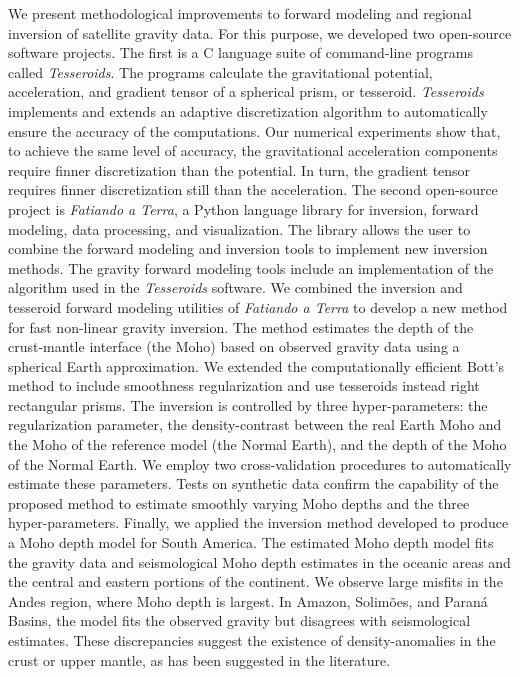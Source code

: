 \begin{foreignabstract}

We present methodological improvements to forward modeling and regional
inversion of satellite gravity data.
For this purpose, we developed two open-source software projects.
The first is a C language suite of command-line programs called
\textit{Tesseroids}.
The programs calculate the gravitational potential, acceleration, and gradient
tensor of a spherical prism, or tesseroid.
\textit{Tesseroids} implements and extends an adaptive discretization algorithm
to automatically ensure the accuracy of the computations.
Our numerical experiments show that, to achieve the same level of accuracy, the
gravitational acceleration components require finner discretization than the
potential.
In turn, the gradient tensor requires finner discretization still than the
acceleration.
The second open-source project is \textit{Fatiando a Terra}, a Python language
library for inversion, forward modeling, data processing, and visualization.
The library allows the user to combine the forward modeling and inversion tools
to implement new inversion methods.
The gravity forward modeling tools include an implementation of the
algorithm used in the \textit{Tesseroids} software.
We combined the inversion and tesseroid forward modeling utilities of
\textit{Fatiando a Terra} to develop a new method for fast non-linear gravity
inversion.
The method estimates the depth of the crust-mantle interface (the Moho) based
on observed gravity data using a spherical Earth approximation.
We extended the computationally efficient Bott's method to include smoothness
regularization and use tesseroids instead right rectangular prisms.
The inversion is controlled by three hyper-parameters: the regularization
parameter, the density-contrast between the real Earth Moho and the Moho of the
reference model (the Normal Earth), and the depth of the Moho of the Normal
Earth.
We employ two cross-validation procedures to automatically estimate these
parameters.
Tests on synthetic data confirm the capability of the proposed method to
estimate smoothly varying Moho depths and the three hyper-parameters.
Finally, we applied the inversion method developed to produce a Moho depth
model for South America.
The estimated Moho depth model fits the gravity data and seismological Moho
depth estimates in the oceanic areas and the central and eastern portions of
the continent.
We observe large misfits in the Andes region, where Moho depth is largest.
In Amazon, Solimões, and Paraná Basins, the model fits the observed gravity
but disagrees with seismological estimates.
These discrepancies suggest the existence of density-anomalies in the crust or
upper mantle, as has been suggested in the literature.
\end{foreignabstract}

